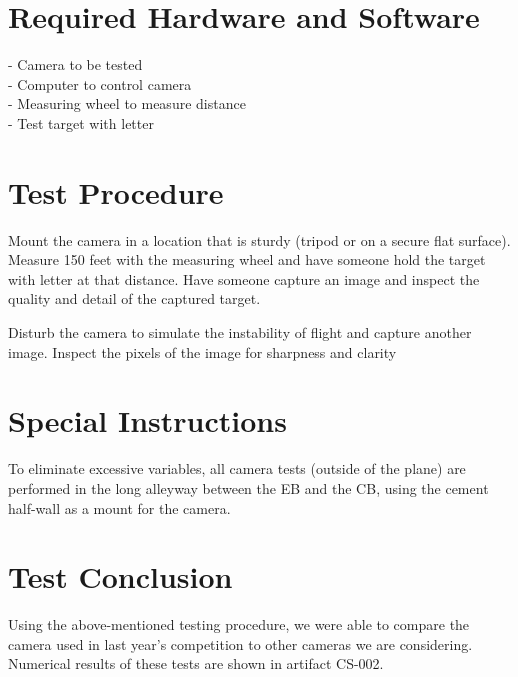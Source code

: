 \documentclass[]{auvsi_doc}
\begin{document}
\section{Required Hardware and Software}

- Camera to be tested\\
- Computer to control camera\\
- Measuring wheel to measure distance\\
- Test target with letter

\section{Test Procedure}
Mount the camera in a location that is sturdy (tripod or on a secure flat surface). Measure 150 feet with the measuring wheel and have someone hold the target with letter at that distance. Have someone capture an image and inspect the quality and detail of the captured target.

Disturb the camera to simulate the instability of flight and capture another image. Inspect the pixels of the image for sharpness and clarity

\section{Special Instructions}

To eliminate excessive variables, all camera tests (outside of the plane) are performed in the long alleyway between the EB and the CB, using the cement half-wall as a mount for the camera.

\section{Test Conclusion}

Using the above-mentioned testing procedure, we were able to compare the camera used in last year's competition to other cameras we are considering. Numerical results of these tests are shown in artifact CS-002.
\end{document}
